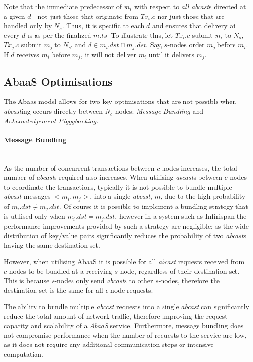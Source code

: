 Note that the immediate predecessor of $m_i$ with respect to \emph{all} \emph{abcast}s directed at a given $d$ - not just those that originate from $Tx_i.c$ nor just those that are handled only by $N_s$. Thus, it is specific to each $d$ and ensures that delivery at every $d$ is as per the finalized $m.ts$. To illustrate this, let $Tx_i.c$ submit $m_i$ to $N_s$, $Tx_j.c$ submit $m_j$ to $N_{s'}$ and $d \in m_i.dst \cap m_j.dst $. Say, $s$-nodes order $m_j$ before $m_i$. If $d$ receives $m_i$ before $m_j$, it will not deliver $m_i$ until it delivers $m_j$.


	\subsection{AbaaS Optimisations}\label{ssec:abaas_optimisations}
	The \textsf{Abaas} model allows for two key optimisations that are not possible when \emph{abcast}ing occurs directly between $N_c$ nodes: \emph{Message Bundling} and \emph{Acknowledgement Piggybacking}.  
	
	\paragraph{Message Bundling} \hspace{0pt} \\
	As the number of concurrent transactions between $c$-nodes increases, the total number of \emph{abcast}s required also increases.  When utilising \emph{abcast}s between $c$-nodes to coordinate the transactions, typically it is not possible to bundle multiple \emph{abcast} messages $<m_i, m_j>$, into a single \emph{abcast}, $m$, due to the high probability of $m_i.dst \neq m_j.dst$.  Of course it is possible to implement a bundling strategy that is utilised only when $m_i.dst = m_j.dst$, however in a system such as Infinispan the performance improvements provided by such a strategy are negligible; as the wide distribution of key/value pairs significantly reduces the probability of two \emph{abcast}s having the same destination set.  
	
	However, when utilising \textsf{AbaaS} it is possible for all \emph{abcast} requests received from $c$-nodes to be bundled at a receiving $s$-node, regardless of their destination set.  This is because $s$-nodes only send \emph{abcast}s to other $s$-nodes, therefore the destination set is the same for all $c$-node requests.  
	
	The ability to bundle multiple \emph{abcast} requests into a single \emph{abcast} can significantly reduce the total amount of network traffic, therefore improving the request capacity and scalability of a \emph{AbaaS} service.  Furthermore, message bundling does not compromise performance when the number of requests to the service are low, as it does not require any additional communication steps or intensive computation.  
	
